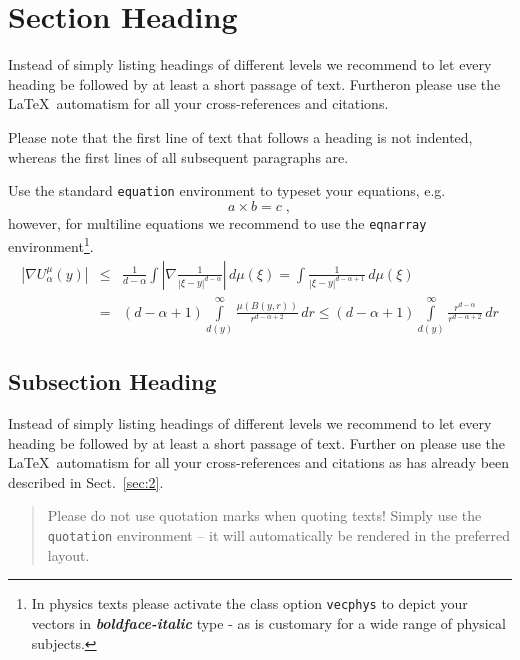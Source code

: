 \documentclass[graybox,envcountchap,sectrefs]{svmono}
\begin{document}
\section{Section Heading}

Instead of simply listing headings of different levels we recommend to let every heading be followed by at least a short passage of text. Furtheron please use the \LaTeX\ automatism for all your cross-references and citations.

Please note that the first line of text that follows a heading is not indented, whereas the first lines of all subsequent paragraphs are.

Use the standard \verb|equation| environment to typeset your equations, e.g.
%
\begin{equation}
	a \times b = c\;,
\end{equation}
%
however, for multiline equations we recommend to use the \verb|eqnarray| environment\footnote{In physics texts please activate the class option \texttt{vecphys} to depict your vectors in \textbf{\itshape boldface-italic} type - as is customary for a wide range of physical subjects.}.
\begin{eqnarray}\nonumber
	\left|\nabla U_{\alpha}^{\mu}(y)\right| &\le&\frac1{d-\alpha}\int
	\left|\nabla\frac1{|\xi-y|^{d-\alpha}}\right|\,d\mu(\xi) =
	\int \frac1{|\xi-y|^{d-\alpha+1}} \,d\mu(\xi)\qquad  \\
	&=&(d-\alpha+1) \int\limits_{d(y)}^\infty
	\frac{\mu(B(y,r))}{r^{d-\alpha+2}}\,dr \le (d-\alpha+1)
	\int\limits_{d(y)}^\infty \frac{r^{d-\alpha}}{r^{d-\alpha+2}}\,dr
	\label{eq:01}
\end{eqnarray}

\enlargethispage{24pt}

\subsection{Subsection Heading}
\label{subsec:2}
Instead of simply listing headings of different levels we recommend to let every heading be followed by at least a short passage of text. Further on please use the \LaTeX\ automatism for all your cross-references and citations as has already been described in Sect.~\ref{sec:2}.

\begin{quotation}
	Please do not use quotation marks when quoting texts! Simply use the \verb|quotation| environment -- it will automatically be rendered in the preferred layout.
\end{quotation}
\end{document}
